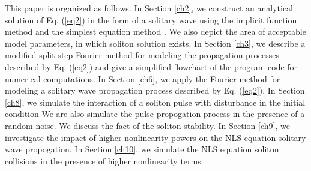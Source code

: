 \documentclass[preprint,12pt]{elsarticle}
\begin{document}
This paper is organized as follows.
In Section \ref{ch2}, we construct an analytical solution of Eq. (\ref{eq2}) in the form of a solitary wave using the implicit function method and the simplest equation method \cite{Rad4}. We also depict the area of acceptable model parameters, in which soliton solution exists. In Section \ref{ch3}, we describe a modified split-step Fourier method for modeling the propagation processes described by Eq. (\ref{eq2}) and give a simplified flowchart of the program code for numerical computations. In Section \ref{ch6}, we apply the Fourier method for modeling a solitary wave propagation process described by Eq. (\ref{eq2}). In Section \ref{ch8}, we simulate the interaction of a soliton pulse with disturbance in the initial condition We are also simulate the pulse propogation process in the presence of a random noise. We discuss the fact of the soliton stability. In Section \ref{ch9}, we investigate the impact of higher nonlinearity powers on the NLS equation solitary wave propogation. In Section \ref{ch10}, we simulate the NLS equation soliton collisions in the presence of higher nonlinearity terms.
\end{document}
